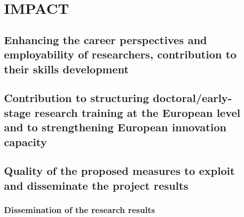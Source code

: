 \documentclass[11pt,a4paper]{article}
\begin{document}
\section{IMPACT}
%
\subsection{Enhancing the career perspectives and employability of researchers, contribution to their skills development} 

\processdelayedfloats

\subsection{Contribution to structuring doctoral/early-stage research training at the European level and to strengthening European innovation capacity}
\label{subsec:ContribToEcon}

\processdelayedfloats
%
\vspace{-2mm}
\subsection{Quality of the proposed measures to exploit and disseminate the project results}
\label{sec:qualityExploitDissemination}
%
\subsubsection{Dissemination of the research results}
\label{sec:dissemination}

%
\end{document}
